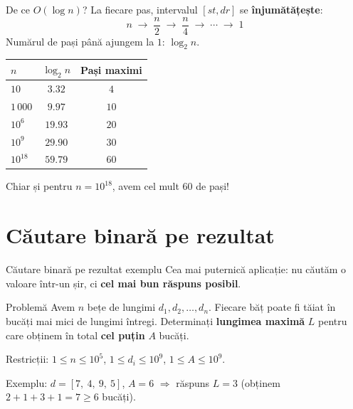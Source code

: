 ﻿\documentclass{beamer}
\begin{document}
\begin{frame}{De ce $O(\log n)$?}
  La fiecare pas, intervalul $[st, dr]$ se \textbf{înjumătățește}:
  \[
    n \;\to\; \frac{n}{2} \;\to\; \frac{n}{4} \;\to\; \cdots \;\to\; 1
  \]
  Numărul de pași până ajungem la $1$: $\log_2 n$.

  \smallskip
  \begin{center}
  \begin{tabular}{lcc}
    \toprule
    $n$ & $\log_2 n$ & Pași maximi \\
    \midrule
    $10$              & $3.32$   & $4$  \\
    $1\,000$          & $9.97$   & $10$ \\
    $10^6$            & $19.93$  & $20$ \\
    $10^9$            & $29.90$  & $30$ \\
    $10^{18}$         & $59.79$  & $60$ \\
    \bottomrule
  \end{tabular}
  \end{center}

  \smallskip
  Chiar și pentru $n = 10^{18}$, avem cel mult $60$ de pași!
\end{frame}


\section{Căutare binară pe rezultat}

\begin{frame}{Căutare binară pe rezultat \textemdash{} exemplu}
  Cea mai puternică aplicație: nu căutăm o valoare într-un șir, ci \textbf{cel mai bun răspuns posibil}.

  \smallskip
  \begin{block}{Problemă}
    Avem $n$ bețe de lungimi $d_1, d_2, \dots, d_n$. Fiecare băț poate fi tăiat în bucăți mai mici de lungimi întregi. Determinați \textbf{lungimea maximă} $L$ pentru care obținem în total \textbf{cel puțin} $A$ bucăți.
  \end{block}

  \smallskip
  Restricții: $1 \leq n \leq 10^5$, $1 \leq d_i \leq 10^9$, $1 \leq A \leq 10^9$.

  Exemplu: $d = [7,\ 4,\ 9,\ 5]$, $A = 6$ $\Rightarrow$ răspuns $L = 3$ (obținem $2+1+3+1 = 7 \geq 6$ bucăți).
\end{frame}
\end{document}
